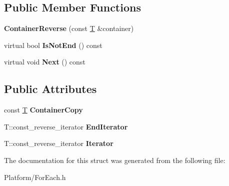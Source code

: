 \subsection*{Public Member Functions}
\begin{DoxyCompactItemize}
\item 
\mbox{\label{struct_gost_crypt_1_1_for_each_1_1_container_reverse_a4fd7b7e75e0c7b2875feeed559fd5a45}} 
{\bfseries Container\+Reverse} (const \hyperlink{_stribog_8c_aba2f4c400d7a4c0bf0296be622087314}{T} \&container)
\item 
\mbox{\label{struct_gost_crypt_1_1_for_each_1_1_container_reverse_ad3741a602c6d6c518a6b9675f113350b}} 
virtual bool {\bfseries Is\+Not\+End} () const
\item 
\mbox{\label{struct_gost_crypt_1_1_for_each_1_1_container_reverse_aa981f33215a7765124e4dbe1f9a3c9c5}} 
virtual void {\bfseries Next} () const
\end{DoxyCompactItemize}
\subsection*{Public Attributes}
\begin{DoxyCompactItemize}
\item 
\mbox{\label{struct_gost_crypt_1_1_for_each_1_1_container_reverse_aaa4a9d0240d5c4d57d520f1241febc1e}} 
const \hyperlink{_stribog_8c_aba2f4c400d7a4c0bf0296be622087314}{T} {\bfseries Container\+Copy}
\item 
\mbox{\label{struct_gost_crypt_1_1_for_each_1_1_container_reverse_aa2dbcaab729419c6ba5fe0a251052a24}} 
T\+::const\+\_\+reverse\+\_\+iterator {\bfseries End\+Iterator}
\item 
\mbox{\label{struct_gost_crypt_1_1_for_each_1_1_container_reverse_a0738c9397062e30bae77ae67adce435d}} 
T\+::const\+\_\+reverse\+\_\+iterator {\bfseries Iterator}
\end{DoxyCompactItemize}


The documentation for this struct was generated from the following file\+:\begin{DoxyCompactItemize}
\item 
Platform/For\+Each.\+h\end{DoxyCompactItemize}

